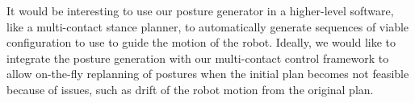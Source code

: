 It would be interesting to use our posture generator in a higher-level software, like a multi-contact stance planner, to automatically generate sequences of viable configuration to use to guide the motion of the robot.
Ideally, we would like to integrate the posture generation with our multi-contact control framework to allow on-the-fly replanning of postures when the initial plan becomes not feasible because of issues, such as drift of the robot motion from the original plan.




